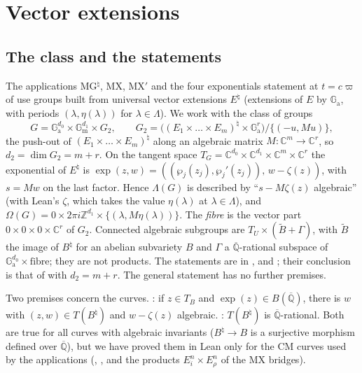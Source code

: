 \documentclass[11pt]{amsart}
\theoremstyle{definition}
\theoremstyle{remark}
\numberwithin{equation}{section}
\newcommand{\ZZ}{\mathbb{Z}}
\newcommand{\CC}{\mathbb{C}}
\newcommand{\Qbar}{\overline{\mathbb{Q}}}
\newcommand{\Ga}{\mathbb{G}_{\mathrm{a}}}
\newcommand{\Gm}{\mathbb{G}_{\mathrm{m}}}
\newcommand{\vp}{\varpi}
\begin{document}
\section{Vector extensions}\label{sec:vecext}

\subsection{The class and the statements}
The applications MG$^\natural$, MX, MX$'$ and the four exponentials statement at $t=c\vp$ of
\cite{Note} use groups built from universal vector extensions $E^\natural$ (extensions of $E$ by
$\Ga$, with periods $(\lambda,\eta(\lambda))$ for $\lambda\in\Lambda$). We work with the class of groups
\[
G=\Ga^{d_0}\times\Gm^{d_1}\times G_2,\qquad G_2=\bigl((E_1\times\dots\times E_m)^\natural\times\Ga^r\bigr)\big/\{(-u,Mu)\},
\]
the push-out of $(E_1\times\dots\times E_m)^\natural$ along an algebraic matrix $M\colon\CC^m\to\CC^r$, so
$d_2=\dim G_2=m+r$. On the tangent space $T_G=\CC^{d_0}\times\CC^{d_1}\times\CC^m\times\CC^r$ the
exponential of $E^\natural$ is $\exp(z,w)=((\wp_j(z_j),\wp_j'(z_j)),\,w-\zeta(z))$, with $s=Mw$ on the last
factor. Hence $\Lambda(G)$ is described by ``$s-M\zeta(z)$ algebraic'' (with Lean's $\zeta$, which takes the
value $\eta(\lambda)$ at $\lambda\in\Lambda$), and $\Omega(G)=0\times2\pi i\ZZ^{d_1}\times\{(\lambda,M\eta(\lambda))\}$. The
\emph{fibre} is the vector part $0\times0\times0\times\CC^r$ of $G_2$. Connected algebraic subgroups are
$T_U\times(\tilde B+\Gamma)$, with $\tilde B$ the image of $B^\natural$ for an abelian subvariety $B$ and $\Gamma$ a
$\Qbar$-rational subspace of $\Ga^{d_0}\times\text{fibre}$; they are not products. The statements are in
,  and ; their conclusion is that of
 with $d_2=m+r$. The general statement  has no further premises.

Two premises concern the curves. : if $z\in T_B$ and $\exp(z)\in B(\Qbar)$, there is $w$ with
$(z,w)\in T(B^\natural)$ and $w-\zeta(z)$ algebraic. : $T(B^\natural)$ is $\Qbar$-rational.
Both are true for all curves with algebraic invariants ($B^\natural\to B$ is a surjective morphism defined
over $\Qbar$), but we have proved them in Lean only for the CM curves used by the applications
(, , and the products $E_i^n\times E_\rho^n$ of the MX
bridges).
\end{document}
